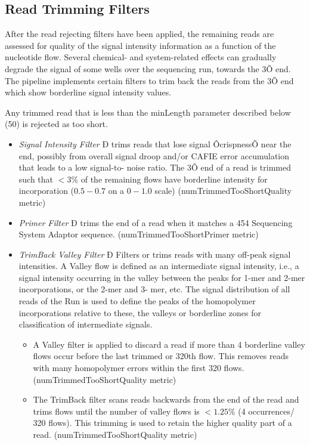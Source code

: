 \documentclass[11pt]{article}
\begin{document}
\subsection{Read Trimming Filters}

After the read rejecting filters have been applied, the remaining reads are assessed for quality of the signal intensity information as a function of the nucleotide flow. Several chemical- and system-related effects can gradually degrade the signal of some wells over the sequencing run, towards the 3Õ end. The pipeline implements certain filters to trim back the reads from the 3Õ end which show borderline signal intensity values.

Any trimmed read that is less than the minLength parameter described below (50) is rejected as too short.

\begin{itemize}
\item \emph{Signal Intensity Filter} Ð trims reads that lose signal ÔcrispnessÕ near the end, possibly from overall signal droop and/or CAFIE error accumulation that leads to a low signal-to- noise ratio. The 3Õ end of a read is trimmed such that $<3\%$ of the remaining flows have borderline intensity for incorporation ($0.5-0.7$ on a $0-1.0$ scale) (numTrimmedTooShortQuality metric)

\item \emph{Primer Filter} Ð trims the end of a read when it matches a 454 Sequencing System Adaptor sequence. (numTrimmedTooShortPrimer metric)

\item \emph{TrimBack Valley Filter} Ð Filters or trims reads with many off-peak signal intensities. A Valley flow is defined as an intermediate signal intensity, i.e., a signal intensity occurring in the valley between the peaks for 1-mer and 2-mer incorporations, or the 2-mer and 3- mer, etc. The signal distribution of all reads of the Run is used to define the peaks of the homopolymer incorporations relative to these, the valleys or borderline zones for classification of intermediate signals.

\begin{itemize}
\item A Valley filter is applied to discard a read if more than 4 borderline valley flows occur before the last trimmed or 320th flow. This removes reads with many homopolymer errors within the first 320 flows. (numTrimmedTooShortQuality metric)
\item The TrimBack filter scans reads backwards from the end of the read and trims flows until the number of valley flows is $< 1.25\%$ (4 occurrences/ 320 flows). This trimming is used to retain the higher quality part of a read. (numTrimmedTooShortQuality metric)
\end{itemize}


\end{itemize}
\end{document}

